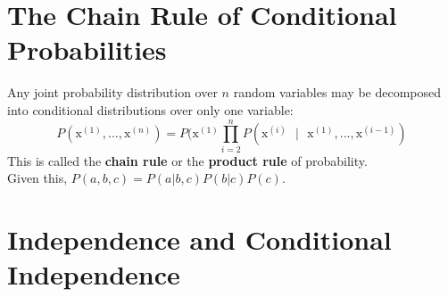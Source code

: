 \documentclass[11pt, twocolumn]{report}
\begin{document}
\section{The Chain Rule of Conditional Probabilities}
Any joint probability distribution over $n$ random variables may be decomposed
into conditional distributions over only one variable:
\begin{equation}
  P(\text{x}^{(1)},...,\text{x}^{(n)}) = P(\text{x}^{(1)} \prod_{i = 2}^{n}
  P(\text{x}^{(i)} \text{ } | \text{ } \text{x}^{(1)},..., \text{x}^{(i-1)})
\end{equation}
This is called the \textbf{chain rule} or the \textbf{product rule} of
probability.\\
Given this, $P(a, b, c) = P(a | b,c)P(b|c)P(c)$.

\section{Independence and Conditional Independence}
\end{document}

